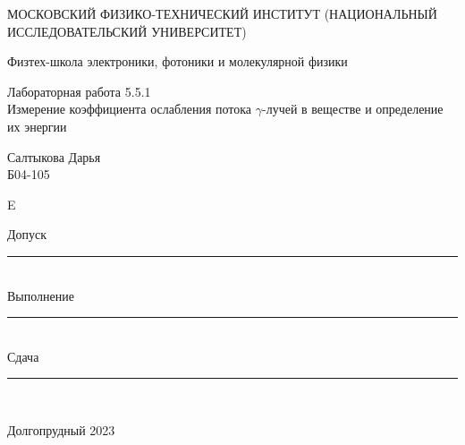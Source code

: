 \documentclass[a4paper,12pt]{article} %
\begin{document}
\newenvironment{lines}[1][\textwidth] %
{
\newcolumntype{E}{>{}p{#1}<{\hrulefill}} %
\begin{flushright} %
\begin{tabular}[h]{E} %
}
{\end{tabular}\end{flushright}
}
	
	\begin{titlepage}
	\begin{center}
		{\large МОСКОВСКИЙ ФИЗИКО-ТЕХНИЧЕСКИЙ ИНСТИТУТ (НАЦИОНАЛЬНЫЙ ИССЛЕДОВАТЕЛЬСКИЙ УНИВЕРСИТЕТ)}
	\end{center}
	\begin{center}
		{\large Физтех-школа электроники, фотоники и молекулярной физики}
	\end{center}
	
	
	\vspace{4.5cm}
	{\huge
		\begin{center}
			{Лабораторная работа 5.5.1}\\
			 {Измерение коэффициента ослабления потока $ \gamma $-лучей в веществе и определение их энергии}
		\end{center}
	}
	\vspace{2cm}
	\begin{flushright}
		{\LARGE Салтыкова Дарья \\
			\vspace{0.5cm}
			Б04-105}
	\end{flushright}
	
	\vspace{0.5cm}
	
	\begin{lines}[.5
	\textwidth]
  {\LARGE Допуск} \rule{6.5cm}{0.25pt} \vspace{0.5cm}\\
 {\LARGE Выполнение} \rule{3cm}{0.25pt}\vspace{0.5cm} \\ {\LARGE Сдача} \rule{3cm}{0.25pt} \\ %
\end{lines}
	\vspace{6cm}
	\begin{center}
		Долгопрудный 2023
	\end{center}
\end{titlepage}
\end{document}
